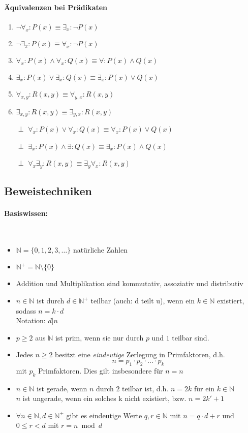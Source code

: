 \paragraph{\"Aquivalenzen bei Pr\"adikaten}
\begin{enumerate}
\item $\neg \forall_x : P(x) \equiv \exists_x: \neg P(x)$
\item $\neg \exists_x : P(x) \equiv \forall_x: \neg P(x)$
\item $\forall_x : P(x) \land \forall_x : Q(x) \equiv \forall : P(x) \land Q(x)$
\item $\exists_x : P(x) \lor \exists_x : Q(x) \equiv \exists_x : P(x) \lor Q(x)$
\item $\forall_{x,y} : R(x,y) \equiv \forall_{y,x} : R(x,y)$
\item $\exists_{x,y} : R(x,y) \equiv \exists_{y,x} : R(x,y)$
\item[$\perp$] $\forall_x : P(x) \lor \forall_x:Q(x) \equiv \forall_x : P(x) \lor Q(x)$
\item[$\perp$] $\exists_x : P(x) \land \exists : Q(x) \equiv \exists_x : P(x) \land Q(x)$
\item[$\perp$] $\forall_x \exists_y : R(x,y) \equiv \exists_y \forall_x : R(x,y)$
\end{enumerate}

\subsection{Beweistechniken}

\paragraph{Basiswissen:}
\ \\
\begin{itemize}
\item $\mathbb{N} = \{0,1,2,3,\ldots\}$ nat\"urliche Zahlen
\item $\mathbb{N}^{+} = \mathbb{N}\setminus\{0\}$
\item Addition und Multiplikation sind kommutativ, assoziativ und distributiv
\item $n\in\mathbb{N}$ ist durch $d\in\mathbb{N}^+$ teilbar (auch: \glqq d teilt u\grqq ), wenn ein $k\in\mathbb{N}$ existiert, sodass $n=k\cdot d$\\
Notation: $d|n$
\item $p\geq 2$ aus $\mathbb{N}$ ist prim, wenn sie nur durch $p$ und $1$ teilbar sind.
\item Jedes $n\geq 2$ besitzt eine \emph{eindeutige} Zerlegung in Primfaktoren, d.h.
\[
n = p_1 \cdot p_2 \cdot \ldots \cdot p_k
\]
mit $p_k$ Primfaktoren. Dies gilt insbesondere f\"ur $n=n$
\item $n\in\mathbb{N}$ ist gerade, wenn $n$ durch $2$ teilbar ist, d.h. $n=2k$ für ein $k\in\mathbb{N}$\\
$n$ ist ungerade, wenn ein solches k nicht existiert, bzw. $n=2k'+1$
\item $\forall n\in\mathbb{N},d\in\mathbb{N}^{+}$ gibt es eindeutige Werte $q,r\in\mathbb{N}$ mit $n=q\cdot d+r$ und $0\leq r< d$ mit $r=n\bmod d$
\end{itemize}

